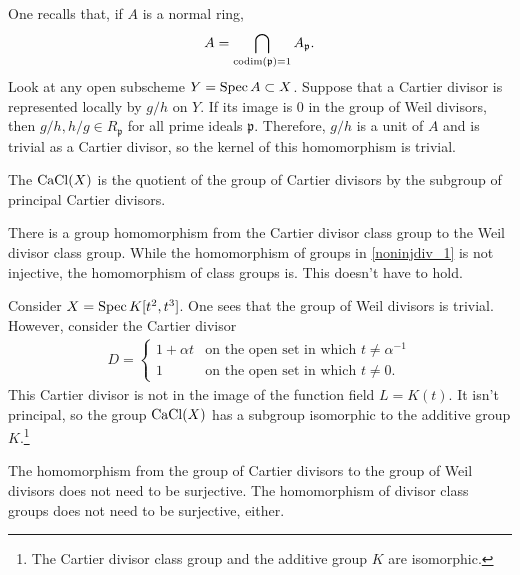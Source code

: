 \documentclass [11 pt, oneside] {article}
\begin{document}
One recalls that, if $A$ is a normal ring,
\begin{align*}
	A = \bigcap_{\operatorname{codim}(\mathfrak{p}) =1} A_{\mathfrak{p}}.
\end{align*}
Look at any open subscheme $Y=\operatorname{Spec} A\subset X$. Suppose that a Cartier divisor is represented locally by $g/h$ on $Y$. If its image is $0$ in the group of Weil divisors, then $g/h,h/g\in R_{\mathfrak{p}}$ for all prime ideals $\mathfrak{p}$. Therefore, $g/h$ is a unit of $A$ and is trivial as a Cartier divisor, so the kernel of this homomorphism is trivial.

\begin{definition}[ ]\label{}\text{}
The  $\operatorname{CaCl}(X)$ is the quotient of the group of Cartier divisors by the subgroup of principal Cartier divisors.
\end{definition}

There is a group homomorphism from the Cartier divisor class group to the Weil divisor class group. While the homomorphism of groups in \cref{noninjdiv_1} is not injective, the homomorphism of class groups is. This doesn't have to hold.

\begin{example}[ ]\label{}\text{}
Consider $X=\operatorname{Spec} K[t^2,t^3]$. One sees that the group of Weil divisors is trivial. However, consider the Cartier divisor
\begin{align*}
	D=
	\begin{cases}
		1+\alpha t &\textrm{on the open set in which $t\ne \alpha^{-1}$}\\
			1 &\textrm{on the open set in which $t\ne 0$.}
	\end{cases}
\end{align*}
This Cartier divisor is not in the image of the function field $L= K(t)$. It isn't principal, so the group $\operatorname{CaCl}(X)$ has a subgroup isomorphic to the additive group $K$.\footnote{The Cartier divisor class group and the additive group $K$ are isomorphic.}
\end{example}

The homomorphism from the group of Cartier divisors to the group of Weil divisors does not need to be surjective. The homomorphism of divisor class groups does not need to be surjective, either.
\end{document}
